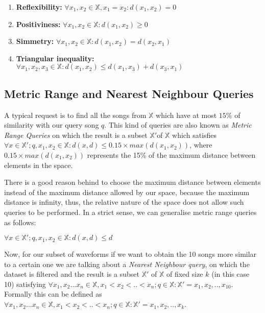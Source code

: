 \begin{enumerate}
\item{\textbf{Reflexibility:} $\forall x_1,x_2 \in \mathbb{X}, x_1=x_2 : d(x_1,x_2) = 0$}
\item{\textbf{Positiviness:} $\forall x_1,x_2 \in \mathbb{X} : d(x_1,x_2) \geq 0$}
\item{\textbf{Simmetry:} $\forall x_1,x_2 \in \mathbb{X} :d(x_1,x_2) = d(x_2,x_1)$}
\item{\textbf{Triangular inequality:} $\forall x_1,x_2,x_3 \in \mathbb{X} :d(x_1,x_2) \leq d(x_1,x_3) + d(x_3,x_1)$}
\end{enumerate}

\subsection{Metric Range and Nearest Neighbour Queries}
A typical request is to find all the songs from $\mathbb{X}$ which have at most $15\%$ of similarity with our query song $q$. This 
kind of queries are also known as \emph{Metric Range Queries} on which the result is a subset $\mathbb{X}'$of $\mathbb{X}$ which satisfies 
$\forall x \in \mathbb{X}'; q, x_1, x_2 \in \mathbb{X} : d(x,d) \leq  0.15 \times max(d(x_1,x_2))$, where $0.15 \times max(d(x_1,x_2))$ represents
the 15\% of the maximum distance between elements in the space. 

There is a good reason behind to choose the maximum distance between elements instead of the maximum distance allowed by our space,
because the maximum distance is infinity, thus, the relative nature of the space does not allow such queries to be performed. In a strict
sense, we can generalise metric range queries as follows:

$\forall x \in \mathbb{X}'; q, x_1, x_2 \in \mathbb{X} : d(x,d) \leq d$

Now, for our subset of waveforms if we want to obtain the 10 songs more similar to a certain one we are talking about
a \emph{Nearest Neighbour query}, on which the dataset is filtered and the result is a subset $\mathbb{X}'$ of $\mathbb{X}$ of fixed size $k$ (in 
this case 10) satisfying $\forall x_1, x_2... x_n \in \mathbb{X}, x_1 < x_2 < .. < x_n ; q \in \mathbb{X} : \mathbb{X}' = {x_1, x_2, .., x_{10} }$.
Formally this can be defined as $\forall x_1, x_2... x_n \in \mathbb{X}, x_1 < x_2 < .. < x_n; q \in \mathbb{X} : \mathbb{X}' = {x_1, x_2, .., x_k }$.

